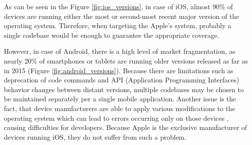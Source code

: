 As can be seen in the Figure \ref{fig:ios_versions}, in case of iOS, almost 90\% of devices are running either the most or second-most recent major version of the operating system. Therefore, when targeting the Apple's system, probably a single codebase would be enough to guarantee the appropriate coverage.

However, in case of Android, there is a high level of market fragmentation, as nearly 20\% of smartphones or tablets are running older versions released as far as in 2015 (Figure \ref{fig:android_versions}). Because there are limitations such as deprecation of code commands and API (Application Programming Interfaces) behavior changes between distant versions, multiple codebases may be chosen to be maintained separately per a single mobile application. Another issue is the fact, that device manufacturers are able to apply various modifications to the operating system which can lead to errors occurring only on those devices \cite{comparison_technologies_multiplatform}, causing difficulties for developers. Because Apple is the exclusive manufacturer of devices running iOS, they do not suffer from such a problem. 

